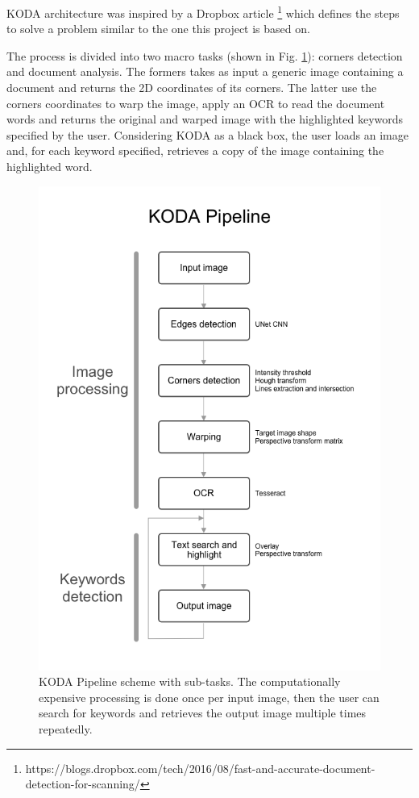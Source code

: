 \documentclass[a4paper]{article}
\begin{document}
KODA architecture was inspired by a Dropbox article \footnote{https://blogs.dropbox.com/tech/2016/08/fast-and-accurate-document-detection-for-scanning/} which defines the steps to solve a problem similar to the one this project is based on.

The process is divided into two macro tasks (shown in Fig. \ref{fig:pipeline}): corners detection and document analysis. The formers takes as input a generic image containing a document and returns the 2D coordinates of its corners. The latter use the corners coordinates to warp the image, apply an OCR to read the document words and returns the original and warped image with the highlighted keywords specified by the user. Considering KODA as a black box, the user loads an image and, for each keyword specified, retrieves a copy of the image containing the highlighted word.

\begin{figure}[H]
	\includegraphics[width=\linewidth]{Pipeline.png}
	\caption{KODA Pipeline scheme with sub-tasks. The computationally expensive processing is done once per input image, then the user can search for keywords and retrieves the output image multiple times repeatedly.}
	\label{fig:pipeline}
\end{figure}
\end{document}

